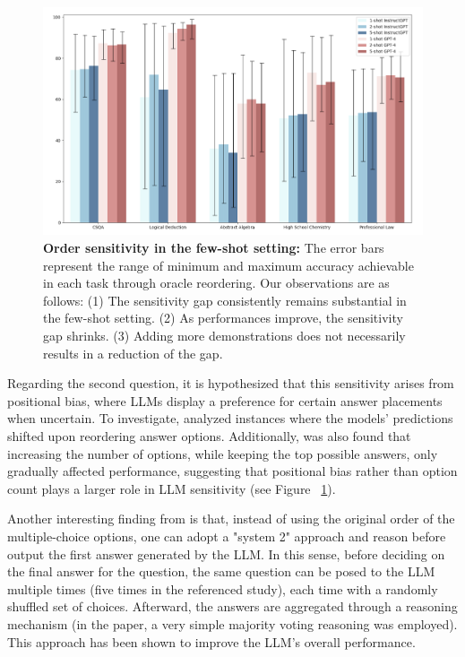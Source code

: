 \begin{figure}[th!]
    \centering
    \includegraphics[width=0.5\paperwidth]{submissions/Estevam2024/figures/few-shot-order.png}
    \caption{\textbf{Order sensitivity in the few-shot setting:} The error bars represent the range of minimum and maximum accuracy achievable in each task through oracle reordering. Our observations are as follows: (1) The sensitivity gap consistently remains substantial in the few-shot setting. (2) As performances improve, the sensitivity gap shrinks. (3) Adding more demonstrations does not necessarily results in a reduction of the gap.}
    \label{fig:few-sens}
\end{figure}

Regarding the second question, it is hypothesized that this sensitivity arises from positional bias, where LLMs display a preference for certain answer placements when uncertain. To investigate, \cite{pezeshkpour2024large} analyzed instances where the models’ predictions shifted upon reordering answer options. Additionally, was also found that increasing the number of options, while keeping the top possible answers, only gradually affected performance, suggesting that positional bias rather than option count plays a larger role in LLM sensitivity (see Figure ~\ref{fig:few-sens}). 

Another interesting finding from \cite{pezeshkpour2024large} is that, instead of using the original order of the multiple-choice options, one can adopt a "system 2" approach and reason before output the first answer generated by the LLM. In this sense, before deciding on the final answer for the question, the same question can be posed to the LLM multiple times (five times in the referenced study), each time with a randomly shuffled set of choices. Afterward, the answers are aggregated through a reasoning mechanism (in the paper, a very simple majority voting reasoning was employed). This approach has been shown to improve the LLM's overall performance.  






